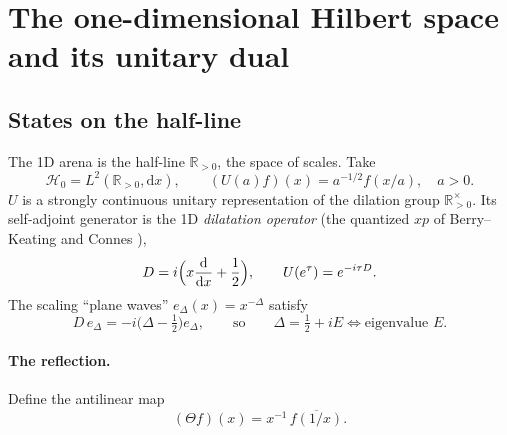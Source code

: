 \documentclass[11pt,a4paper]{article}
\theoremstyle{plain}
\theoremstyle{definition}
\theoremstyle{remark}
\newcommand{\R}{\mathbb{R}}
\newcommand{\cH}{\mathcal{H}}
\newcommand{\dd}{\mathrm{d}}
\newcommand{\Rp}{\R_{>0}}
\begin{document}
\section{The one-dimensional Hilbert space and its unitary dual}
\label{sec:dual}

\subsection{States on the half-line}

The 1D arena is the half-line $\Rp$, the space of scales. Take
\begin{equation}\label{eq:H}
\cH_0=L^2(\Rp,\dd x),\qquad (U(a)f)(x)=a^{-1/2}f(x/a),\quad a>0 .
\end{equation}
$U$ is a strongly continuous unitary representation of the dilation group
$\Rp^\times$. Its self-adjoint generator is the 1D \emph{dilatation
operator} (the quantized $xp$ of Berry--Keating \cite{BerryKeating1999} and
Connes \cite{Connes1999}),
\begin{equation}\label{eq:D}
D=i\Bigl(x\frac{\dd}{\dd x}+\frac12\Bigr),\qquad U(e^{\tau})=e^{-i\tau D}.
\end{equation}
The scaling ``plane waves'' $e_\Delta(x)=x^{-\Delta}$ satisfy
\begin{equation}\label{eq:eig}
D\,e_\Delta=-i\bigl(\Delta-\tfrac12\bigr)e_\Delta ,
\qquad\text{so}\qquad \Delta=\tfrac12+iE\iff \text{eigenvalue }E .
\end{equation}

\paragraph{The reflection.} Define the antilinear map
\begin{equation}\label{eq:Theta}
(\Theta f)(x)=x^{-1}\,\overline{f(1/x)} .
\end{equation}
\end{document}
